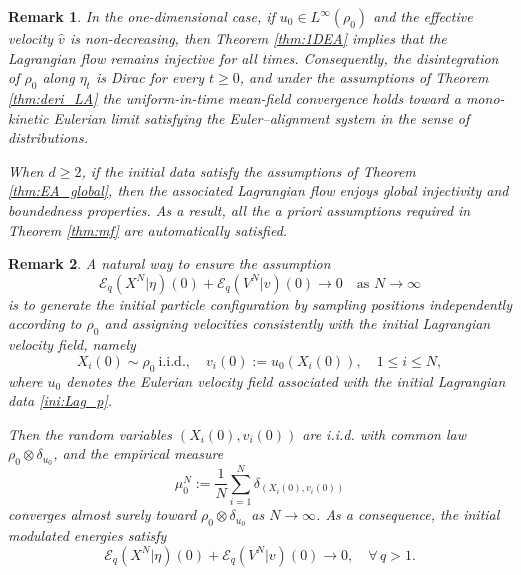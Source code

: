 \documentclass[10pt,reqno]{amsart}
\renewcommand{\ge}{\geqslant}
\renewcommand{\le}{\leqslant}
\numberwithin{equation}{section}
\newtheorem{remark}{Remark}[section]
\begin{document}
 
\begin{remark}
In the one-dimensional case, if $u_0 \in L^\infty(\rho_0)$ and the effective velocity $\widehat v$ is non-decreasing, then Theorem \ref{thm:1DEA} implies that the Lagrangian flow remains injective for all times. Consequently, the disintegration of $\rho_0$ along $\eta_t$ is Dirac for every $t\ge0$, and under the assumptions of Theorem \ref{thm:deri_LA} the uniform-in-time mean-field convergence holds toward a mono-kinetic Eulerian limit satisfying the Euler--alignment system in the sense of distributions.

When $d\ge2$, if the initial data satisfy the assumptions of Theorem \ref{thm:EA_global}, then the associated Lagrangian flow enjoys global injectivity and boundedness properties. As a result, all the a priori assumptions required in Theorem \ref{thm:mf} are automatically satisfied.
\end{remark} 
 
 
\begin{remark}
A natural way to ensure the assumption
\[
\mathscr{E}_q(X^N|\eta)(0) + \mathscr{E}_q(V^N|v)(0)\to 0 \quad \text{as } N \to \infty
\]
is to generate the initial particle configuration by sampling positions independently according to $\rho_0$ and assigning velocities consistently with the initial Lagrangian velocity field, namely
\[
X_i(0)\sim\rho_0 \ \text{i.i.d.},\quad v_i(0):=u_0(X_i(0)), \quad 1\le i\le N,
\]
where $u_0$ denotes the Eulerian velocity field associated with the initial Lagrangian data \eqref{ini:Lag_p}.

Then the random variables $(X_i(0),v_i(0))$ are i.i.d. with common law $\rho_0\otimes\delta_{u_0}$, and the empirical measure
\[
\mu_0^N:=\frac1N\sum_{i=1}^N \delta_{(X_i(0),v_i(0))}
\]
converges almost surely toward $\rho_0\otimes\delta_{u_0}$ as $N\to\infty$. As a consequence, the initial modulated energies satisfy
\[
\mathscr{E}_q(X^N|\eta)(0)+\mathscr{E}_q(V^N|v)(0)\to 0, \quad \forall\, q>1.
\]
\end{remark}
\end{document}
